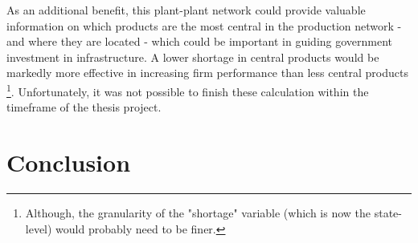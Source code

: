\documentclass[11pt]{article}
\begin{document}
As an additional benefit, this plant-plant network could provide valuable information on which products are the most central in the production network - and where they are located - which could be important in guiding government investment in infrastructure. A lower shortage in central products would be markedly more effective in increasing firm performance than less central products \footnote{Although, the granularity of the "shortage" variable (which is now the state-level) would probably need to be finer.}. Unfortunately, it was not possible to finish these calculation within the timeframe of the thesis project.

\newpage

\section{Conclusion}%
\label{sec:conclusion}


\newpage


\end{document}
